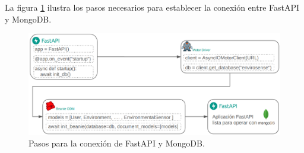 La figura \ref{fig:conexion mongo} ilustra los pasos necesarios para establecer
la conexión entre FastAPI y MongoDB.

\begin{figure}[H]
    \centering
    \includegraphics[width=.87\textwidth]{./Images/19.png}
    \caption{Pasos para la conexión de FastAPI y MongoDB.}
    \label{fig:conexion mongo}
\end{figure}







